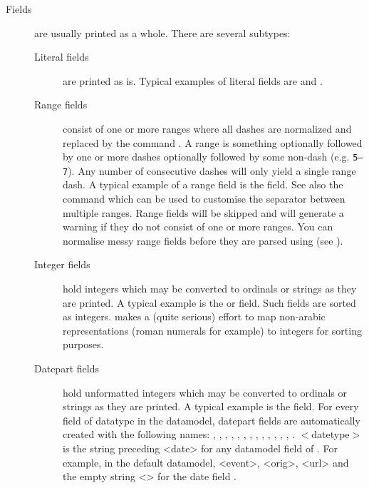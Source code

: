 \documentclass{ltxdockit}[2011/03/25]
\newcommand*{\biber}{\sty{biber}\xspace}
\begin{document}
\begin{description}

\item[Fields] are usually printed as a whole. There are several subtypes:

\begin{description}

\item[Literal fields] are printed as is. Typical examples of literal fields are  and .

\item[Range fields] consist of one or more ranges where all dashes are normalized and replaced by the command . A range is something optionally followed by one or more dashes optionally followed by some non-dash (e.g. \texttt{5--7}). Any number of consecutive dashes will only yield a single range dash. A typical example of a range field is the  field. See also the  command which can be used to customise the separator between multiple ranges. Range fields will be skipped and will generate a warning if they do not consist of one or more ranges. You can normalise messy range fields before they are parsed using  (see ).

\item[Integer fields] hold integers which may be converted to ordinals or strings as they are printed. A typical example is the  or  field. Such fields are sorted as integers. \biber makes a (quite serious) effort to map non-arabic representations (roman numerals for example) to integers for sorting purposes. 

\item[Datepart fields] hold unformatted integers which may be converted to ordinals or strings as they are printed. A typical example is the  field. For every field of datatype  in the datamodel, datepart fields are automatically created with the following names: , , , , , , , , , , , , , . $<$datetype$>$ is the string preceding <date> for any datamodel field of . For example, in the default datamodel, <event>, <orig>, <url> and the empty string <> for the date field .


\end{description}
\end{description}
\end{document}
